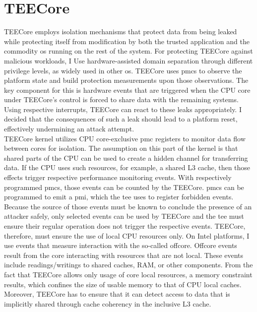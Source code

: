 \section{TEECore}
\label{sec:30:tee_kernel}
TEECore employs isolation mechanisms that protect data from being leaked while
protecting itself from modification by both the trusted application and the
commodity \gls{os} running on the rest of the system. For protecting TEECore
against malicious workloads, I Use hardware-assisted domain separation through
different privilege levels, as widely used in other \gls{os}. TEECore uses
\glspl{pmc} to observe the platform state and build protection measurements upon
those observations. The key component for this is hardware events that are
triggered when the CPU core under TEECore's control is forced to share data with
the remaining systems. Using respective interrupts, TEECore can react to these
leaks appropriately. I decided that the consequences of such a leak should lead
to a platform reset, effectively undermining an attack attempt.\\

TEECore kernel utilizes CPU core-exclusive \gls{pmc} registers to monitor data
flow between cores for isolation. The assumption on this part of the kernel is
that shared parts of the CPU can be used to create a hidden channel for
transferring data. If the CPU uses such resources, for example, a shared L3
cache, then those effects trigger respective performance monitoring events. With
respectively programmed \glspl{pmc}, those events can be counted by the TEECore.
\glspl{pmc} can be programmed to emit a \gls{pmi}, which the \gls{tee} uses to
register forbidden events. Because the source of those events must be known to
conclude the presence of an attacker safely, only selected events can be used by
TEECore and the \gls{tee} must ensure their regular operation does not trigger
the respective events. TEECore, therefore, must ensure the use of local CPU
resources only. On Intel platforms, I use events that measure interaction with
the so-called offcore. Offcore events result from the core interacting with
resources that are not local. These events include readings/writings to shared
caches, RAM, or other components. From the fact that TEECore allows only usage
of core local resources, a memory constraint results, which confines the size of
usable memory to that of CPU local caches. Moreover, TEECore has to ensure that
it can detect access to data that is implicitly shared through cache coherency
in the inclusive L3 cache.\\

